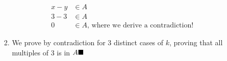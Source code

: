 \documentclass{article}
\begin{document}
\begin{itemize}
\begin{enumerate}[label=(\alph*)]
\begin{enumerate}[label=\arabic*.]
\begin{center}
                \end{center}
                \begin{align*}
                    x - y &\in A\\
                    3 - 3 &\in A\\
                    0 &\in A \text{, where we derive a contradiction!}
                \end{align*}
                \item We prove by contradiction for 3 distinct cases of $k$, proving that all multiples of 3 is in $A \hfill\blacksquare$
            \end{enumerate}
        \end{enumerate}
    \end{itemize}
    
\end{document}

